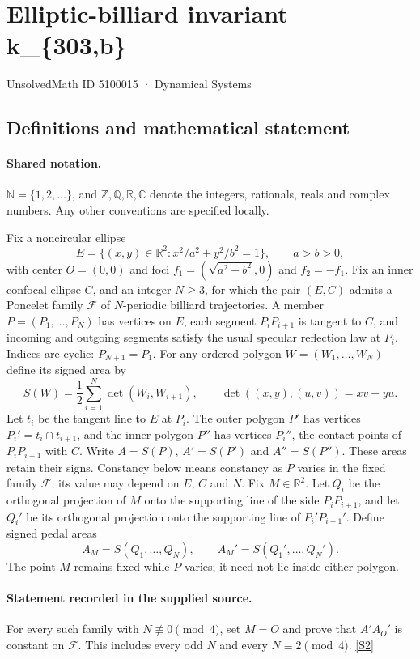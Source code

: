 \documentclass[11pt]{article}
\newcommand{\sref}[2]{\hyperlink{source:#1:#2}{[S#2]}}
\begin{document}
\setcounter{section}{5100014}
\section{Elliptic-billiard invariant k\_\{303,b\}}\label{5100015}
{\small\sffamily UnsolvedMath ID 5100015 · Dynamical Systems}
\subsection{Definitions and mathematical statement}

\paragraph{Shared notation.}$\mathbb N=\{1,2,\ldots\}$, and $\mathbb Z,\mathbb Q,\mathbb R,\mathbb C$ denote the integers, rationals, reals and complex numbers. Any other conventions are specified locally.


Fix a noncircular ellipse
\[
E=\{(x,y)\in\mathbb R^2:x^2/a^2+y^2/b^2=1\},\qquad a>b>0,
\]
with center $O=(0,0)$ and foci $f_1=(\sqrt{a^2-b^2},0)$ and $f_2=-f_1$. Fix an inner confocal ellipse $C$, and an integer $N\geq3$, for which the pair $(E,C)$ admits a Poncelet family $\mathcal F$ of $N$-periodic billiard trajectories. A member $P=(P_1,\ldots,P_N)$ has vertices on $E$, each segment $P_iP_{i+1}$ is tangent to $C$, and incoming and outgoing segments satisfy the usual specular reflection law at $P_i$. Indices are cyclic: $P_{N+1}=P_1$.
For any ordered polygon $W=(W_1,\ldots,W_N)$ define its signed area by
\[
S(W)=\frac12\sum_{i=1}^N\det(W_i,W_{i+1}),\qquad
\det((x,y),(u,v))=xv-yu.
\]
Let $t_i$ be the tangent line to $E$ at $P_i$. The outer polygon $P'$ has vertices $P_i'=t_i\cap t_{i+1}$, and the inner polygon $P''$ has vertices $P_i''$, the contact points of $P_iP_{i+1}$ with $C$. Write $A=S(P)$, $A'=S(P')$ and $A''=S(P'')$. These areas retain their signs. Constancy below means constancy as $P$ varies in the fixed family $\mathcal F$; its value may depend on $E$, $C$ and $N$.
Fix $M\in\mathbb R^2$. Let $Q_i$ be the orthogonal projection of $M$ onto the supporting line of the side $P_iP_{i+1}$, and let $Q_i'$ be its orthogonal projection onto the supporting line of $P_i'P_{i+1}'$. Define signed pedal areas
\[
A_M=S(Q_1,\ldots,Q_N),\qquad A_M'=S(Q_1',\ldots,Q_N').
\]
The point $M$ remains fixed while $P$ varies; it need not lie inside either polygon.
\paragraph{Statement recorded in the supplied source.}
For every such family with $N\not\equiv0\pmod4$, set $M=O$ and prove that $A' A_O'$ is constant on $\mathcal F$. This includes every odd $N$ and every $N\equiv2\pmod4$. \sref{5100015}{2}
\end{document}
